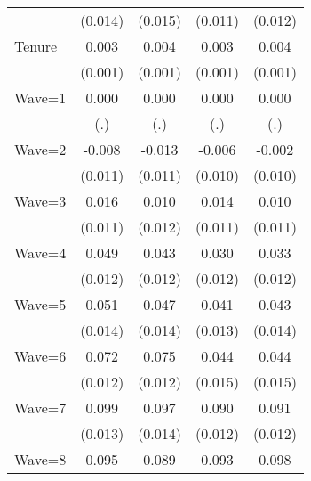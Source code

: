 {\begin{tabular}{l*{4}{c}}
                    &     (0.014)         &     (0.015)         &     (0.011)         &     (0.012)         \\
Tenure              &       0.003\sym{***}&       0.004\sym{***}&       0.003\sym{***}&       0.004\sym{***}\\
                    &     (0.001)         &     (0.001)         &     (0.001)         &     (0.001)         \\
Wave=1              &       0.000         &       0.000         &       0.000         &       0.000         \\
                    &         (.)         &         (.)         &         (.)         &         (.)         \\
Wave=2              &      -0.008         &      -0.013         &      -0.006         &      -0.002         \\
                    &     (0.011)         &     (0.011)         &     (0.010)         &     (0.010)         \\
Wave=3              &       0.016         &       0.010         &       0.014         &       0.010         \\
                    &     (0.011)         &     (0.012)         &     (0.011)         &     (0.011)         \\
Wave=4              &       0.049\sym{***}&       0.043\sym{***}&       0.030\sym{**} &       0.033\sym{***}\\
                    &     (0.012)         &     (0.012)         &     (0.012)         &     (0.012)         \\
Wave=5              &       0.051\sym{***}&       0.047\sym{***}&       0.041\sym{***}&       0.043\sym{***}\\
                    &     (0.014)         &     (0.014)         &     (0.013)         &     (0.014)         \\
Wave=6              &       0.072\sym{***}&       0.075\sym{***}&       0.044\sym{***}&       0.044\sym{***}\\
                    &     (0.012)         &     (0.012)         &     (0.015)         &     (0.015)         \\
Wave=7              &       0.099\sym{***}&       0.097\sym{***}&       0.090\sym{***}&       0.091\sym{***}\\
                    &     (0.013)         &     (0.014)         &     (0.012)         &     (0.012)         \\
Wave=8              &       0.095\sym{***}&       0.089\sym{***}&       0.093\sym{***}&       0.098\sym{***}\\

\end{tabular}}
